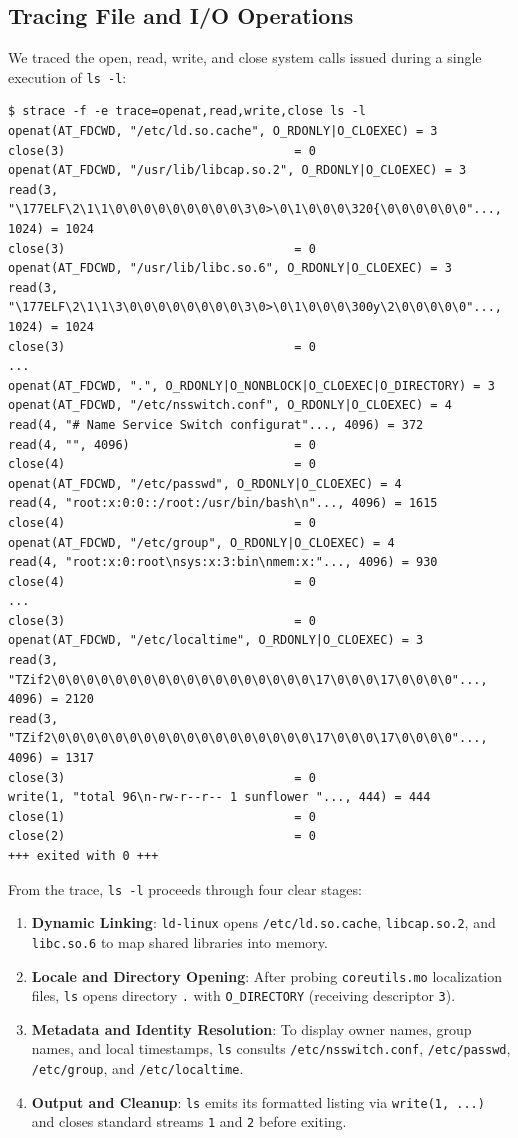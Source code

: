 \documentclass[12pt,a4paper]{article}
\begin{document}
\subsection{Tracing File and I/O Operations}
We traced the open, read, write, and close system calls issued during a single execution of \texttt{ls -l}:
\begin{lstlisting}[style=consolestyle]
$ strace -f -e trace=openat,read,write,close ls -l
openat(AT_FDCWD, "/etc/ld.so.cache", O_RDONLY|O_CLOEXEC) = 3
close(3)                                = 0
openat(AT_FDCWD, "/usr/lib/libcap.so.2", O_RDONLY|O_CLOEXEC) = 3
read(3, "\177ELF\2\1\1\0\0\0\0\0\0\0\0\0\3\0>\0\1\0\0\0\320{\0\0\0\0\0\0"..., 1024) = 1024
close(3)                                = 0
openat(AT_FDCWD, "/usr/lib/libc.so.6", O_RDONLY|O_CLOEXEC) = 3
read(3, "\177ELF\2\1\1\3\0\0\0\0\0\0\0\0\3\0>\0\1\0\0\0\300y\2\0\0\0\0\0"..., 1024) = 1024
close(3)                                = 0
...
openat(AT_FDCWD, ".", O_RDONLY|O_NONBLOCK|O_CLOEXEC|O_DIRECTORY) = 3
openat(AT_FDCWD, "/etc/nsswitch.conf", O_RDONLY|O_CLOEXEC) = 4
read(4, "# Name Service Switch configurat"..., 4096) = 372
read(4, "", 4096)                       = 0
close(4)                                = 0
openat(AT_FDCWD, "/etc/passwd", O_RDONLY|O_CLOEXEC) = 4
read(4, "root:x:0:0::/root:/usr/bin/bash\n"..., 4096) = 1615
close(4)                                = 0
openat(AT_FDCWD, "/etc/group", O_RDONLY|O_CLOEXEC) = 4
read(4, "root:x:0:root\nsys:x:3:bin\nmem:x:"..., 4096) = 930
close(4)                                = 0
...
close(3)                                = 0
openat(AT_FDCWD, "/etc/localtime", O_RDONLY|O_CLOEXEC) = 3
read(3, "TZif2\0\0\0\0\0\0\0\0\0\0\0\0\0\0\0\0\0\0\17\0\0\0\17\0\0\0\0"..., 4096) = 2120
read(3, "TZif2\0\0\0\0\0\0\0\0\0\0\0\0\0\0\0\0\0\0\17\0\0\0\17\0\0\0\0"..., 4096) = 1317
close(3)                                = 0
write(1, "total 96\n-rw-r--r-- 1 sunflower "..., 444) = 444
close(1)                                = 0
close(2)                                = 0
+++ exited with 0 +++
\end{lstlisting}

From the trace, \texttt{ls -l} proceeds through four clear stages:
\begin{enumerate}
    \item \textbf{Dynamic Linking}: \texttt{ld-linux} opens \texttt{/etc/ld.so.cache}, \texttt{libcap.so.2}, and \texttt{libc.so.6} to map shared libraries into memory.
    \item \textbf{Locale and Directory Opening}: After probing \texttt{coreutils.mo} localization files, \texttt{ls} opens directory \texttt{.} with \texttt{O\_DIRECTORY} (receiving descriptor \texttt{3}).
    \item \textbf{Metadata and Identity Resolution}: To display owner names, group names, and local timestamps, \texttt{ls} consults \texttt{/etc/nsswitch.conf}, \texttt{/etc/passwd}, \texttt{/etc/group}, and \texttt{/etc/localtime}.
    \item \textbf{Output and Cleanup}: \texttt{ls} emits its formatted listing via \texttt{write(1, ...)} and closes standard streams \texttt{1} and \texttt{2} before exiting.
\end{enumerate}
\end{document}
